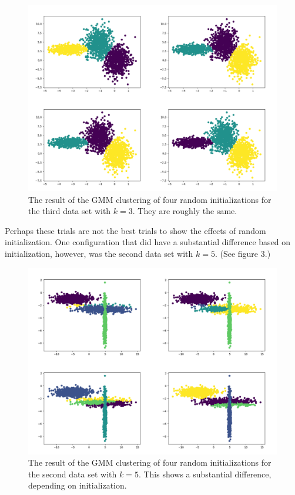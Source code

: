 \documentclass{article}
\begin{document}
\begin{figure}[!ht]
	\centering
	\includegraphics[width=120mm]{figs/gmm_ds2_k3_orthog_plt_4trials.png}
	\caption{The result of the GMM clustering of four random initializations for 
        the third data set with $k = 3$. They are roughly the same.}
\end{figure}

Perhaps these trials are not the best trials to show the effects of random 
initialization. One configuration that did have a substantial difference 
based on initialization, however, was the second data set with $k = 5$. (See figure 3.)

\begin{figure}[!ht]
	\centering
	\includegraphics[width=120mm]{figs/gmm_ds1_k5_orthog_plt_4trials.png}
	\caption{The result of the GMM clustering of four random initializations for 
        the second data set with $k = 5$. This shows a substantial difference, 
        depending on initialization.}
\end{figure}
\end{document}
